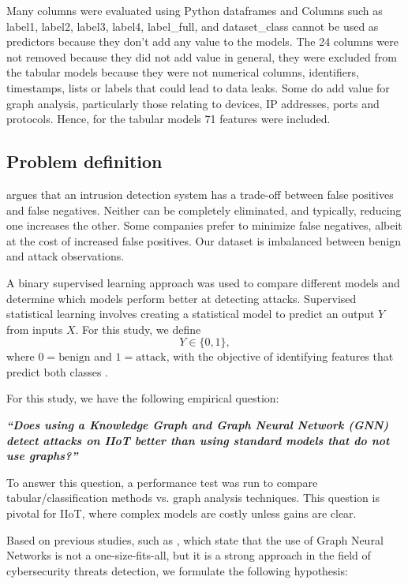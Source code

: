 \documentclass[final,5p,times,twocolumn]{elsarticle}
\begin{document}
Many columns were evaluated using Python dataframes and Columns such as label1, label2, label3, label4, label\_full, and dataset\_class cannot be used as predictors because they don’t add any value to the models. The 24 columns were not removed because they did not add value in general, they were excluded from the tabular models because they were not numerical columns, identifiers, timestamps, lists or labels that could lead to data leaks. Some do add value for graph analysis, particularly those relating to devices, IP addresses, ports and protocols. Hence, for the tabular models 71 features were included.






\subsection{Problem definition}
\label{problem-definition}
 \cite{scarfone2007guide} argues that an intrusion detection system has a trade-off between false positives and false negatives. Neither can be completely eliminated, and typically, reducing one increases the other. Some companies prefer to minimize false negatives, albeit at the cost of increased false positives. Our dataset is imbalanced between benign and attack observations.

A binary supervised learning approach was used to compare different models and determine which models perform better at detecting attacks. Supervised statistical learning involves creating a statistical model to predict an output \(Y\) from inputs \(X\). For this study, we define
\[
Y \in \{0,1\},
\]
where \(0 = \text{benign}\) and \(1 = \text{attack}\), with the objective of identifying features that predict both classes \citep{alma990016042380204808}.

For this study, we have the following empirical question:



\begin{center}
\textit{\textbf{``Does using a Knowledge Graph and Graph Neural Network (GNN) detect attacks on IIoT better than using standard models that do not use graphs?''}}
\end{center}

To answer this question, a performance test was run to compare tabular/classification methods vs. graph analysis techniques. This question is pivotal for IIoT, where complex models are costly unless gains are clear.

Based on previous studies, such as \citep{hwang2026cgllm,bilot2023graph,gokstorp_machine_2026,altaf_gnn-based_2024}, which state that the use of Graph Neural Networks is not a one-size-fits-all, but it is a strong approach in the field of cybersecurity threats detection, we formulate the following hypothesis:
\end{document}
